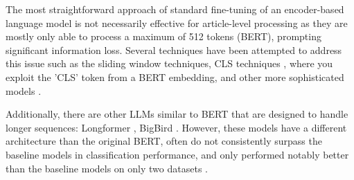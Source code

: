 The most straightforward approach of standard fine-tuning of an encoder-based language model is not necessarily effective for article-level processing as they are mostly only able to process a maximum of 512 tokens (BERT), prompting significant information loss. Several techniques have been attempted to address this issue such as the sliding window techniques, CLS techniques \cite{su-2021-classifying}, where you exploit the 'CLS' token from a BERT embedding, and other more sophisticated models \cite{kulkarni-2018-multi-view}.

Additionally, there are other LLMs similar to BERT that are designed to handle longer sequences: Longformer \cite{beltagy-2020-longformer}, BigBird \cite{zaheer-2021-bigbird}. However, these models have a different architecture than the original BERT, often do not consistently surpass the baseline models in classification performance, and only performed notably better than the baseline models on only two datasets \cite{park-2022-efficient}.


